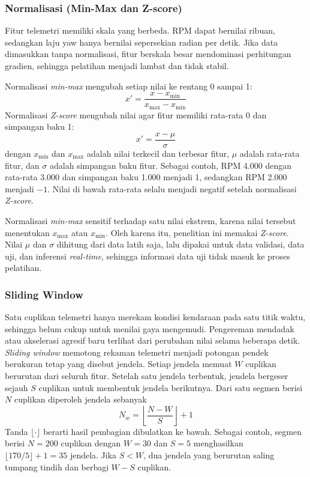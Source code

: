 \subsubsection{Normalisasi (Min-Max dan Z-score)}
Fitur telemetri memiliki skala yang berbeda. RPM dapat bernilai ribuan, sedangkan laju yaw hanya bernilai sepersekian radian per detik. Jika data dimasukkan tanpa normalisasi, fitur berskala besar mendominasi perhitungan gradien, sehingga pelatihan menjadi lambat dan tidak stabil.

Normalisasi \textit{min-max} mengubah setiap nilai ke rentang 0 sampai 1:
\begin{equation}
  x' = \frac{x - x_{\min}}{x_{\max} - x_{\min}}
  \label{eq:minmax}
\end{equation}
Normalisasi \textit{Z-score} mengubah nilai agar fitur memiliki rata-rata 0 dan simpangan baku 1:
\begin{equation}
  x' = \frac{x - \mu}{\sigma}
  \label{eq:zscore}
\end{equation}
dengan $x_{\min}$ dan $x_{\max}$ adalah nilai terkecil dan terbesar fitur, $\mu$ adalah rata-rata fitur, dan $\sigma$ adalah simpangan baku fitur. Sebagai contoh, RPM 4.000 dengan rata-rata 3.000 dan simpangan baku 1.000 menjadi 1, sedangkan RPM 2.000 menjadi $-1$. Nilai di bawah rata-rata selalu menjadi negatif setelah normalisasi \textit{Z-score}.

Normalisasi \textit{min-max} sensitif terhadap satu nilai ekstrem, karena nilai tersebut menentukan $x_{\max}$ atau $x_{\min}$. Oleh karena itu, penelitian ini memakai \textit{Z-score}. Nilai $\mu$ dan $\sigma$ dihitung dari data latih saja, lalu dipakai untuk data validasi, data uji, dan inferensi \textit{real-time}, sehingga informasi data uji tidak masuk ke proses pelatihan.

\subsubsection{Sliding Window}
Satu cuplikan telemetri hanya merekam kondisi kendaraan pada satu titik waktu, sehingga belum cukup untuk menilai gaya mengemudi. Pengereman mendadak atau akselerasi agresif baru terlihat dari perubahan nilai selama beberapa detik. \textit{Sliding window} memotong rekaman telemetri menjadi potongan pendek berukuran tetap yang disebut jendela. Setiap jendela memuat $W$ cuplikan berurutan dari seluruh fitur. Setelah satu jendela terbentuk, jendela bergeser sejauh $S$ cuplikan untuk membentuk jendela berikutnya. Dari satu segmen berisi $N$ cuplikan diperoleh jendela sebanyak
\begin{equation}
  N_{w} = \left\lfloor \frac{N - W}{S} \right\rfloor + 1
  \label{eq:jumlah-window}
\end{equation}
Tanda $\lfloor \cdot \rfloor$ berarti hasil pembagian dibulatkan ke bawah. Sebagai contoh, segmen berisi $N = 200$ cuplikan dengan $W = 30$ dan $S = 5$ menghasilkan $\lfloor 170/5 \rfloor + 1 = 35$ jendela. Jika $S < W$, dua jendela yang berurutan saling tumpang tindih dan berbagi $W - S$ cuplikan.

